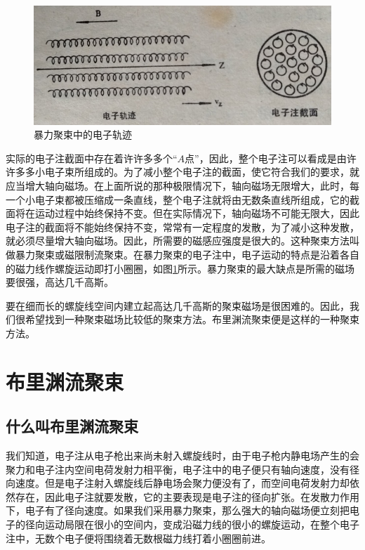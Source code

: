 \begin{figure}[phtb]
	\centering
	\includegraphics[width=0.65\linewidth]{figure/ch7-6}
	\caption{暴力聚束中的电子轨迹}
	\label{ch7-6}
\end{figure}

实际的电子注截面中存在着许许多多个“$ A $点”，因此，整个电子注可以看成是由许许多多小电子束所组成的。为了减小整个电子注的截面，使它符合我们的要求，就应当增大轴向磁场。在上面所说的那种极限情况下，轴向磁场无限增大，此时，每一个小电子束都被压缩成一条直线，整个电子注就将由无数条直线所组成，它的截面将在运动过程中始终保持不变。但在实际情况下，轴向磁场不可能无限大，因此电子注的截面将不能始终保持不变，常常有一定程度的发散，为了减小这种发散，就必须尽量增大轴向磁场。因此，所需要的磁感应强度是很大的。这种聚束方法叫做暴力聚束或磁限制流聚束。在暴力聚束的电子注中，电子运动的特点是沿着各自的磁力线作螺旋运动即打小圈圈，如图\ref{ch7-6}所示。暴力聚束的最大缺点是所需的磁场要很强，高达几千高斯。

要在细而长的螺旋线空间内建立起高达几千高斯的聚束磁场是很困难的。因此，我们很希望找到一种聚束磁场比较低的聚束方法。布里渊流聚束便是这样的一种聚束方法。

\section{布里渊流聚束}

\subsection{什么叫布里渊流聚束}

我们知道，电子注从电子枪出来尚未射入螺旋线时，由于电子枪内静电场产生的会聚力和电子注内空间电荷发射力相平衡，电子注中的电子便只有轴向速度，没有径向速度。但是电子注射入螺旋线后静电场会聚力便没有了，而空间电荷发射力却依然存在，因此电子注就要发散，它的主要表现是电子注的径向扩张。在发散力作用下，电子有了径向速度。如果我们采用暴力聚束，那么强大的轴向磁场便立刻把电子的径向运动局限在很小的空间内，变成沿磁力线的很小的螺旋运动，在整个电子注中，无数个电子便将围绕着无数根磁力线打着小圈圈前进。

